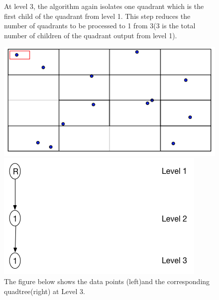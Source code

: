 \documentclass{article}
\begin{document}
\begin{figure}[ht]
At level 3, the algorithm again isolates one quadrant which is the first child of the quadrant from level 1. 
This step reduces the number of quadrants to be processed to 1 from 3(3 is the total number of children of the quadrant output from level 1).
\caption{The figure below shows the data points (left)and the corresponding quadtree(right) at Level 3.}
  \centering
  \begin{minipage}[b]{0.35\textwidth}
    \includegraphics[width=\textwidth]{1_1Quad1_3}  
  \end{minipage}
  \hfill
  \begin{minipage}[b]{0.5\textwidth}
    \includegraphics[width=\textwidth]{1Quad_3_tree}
  \end{minipage}
\end{figure}
\end{document}
